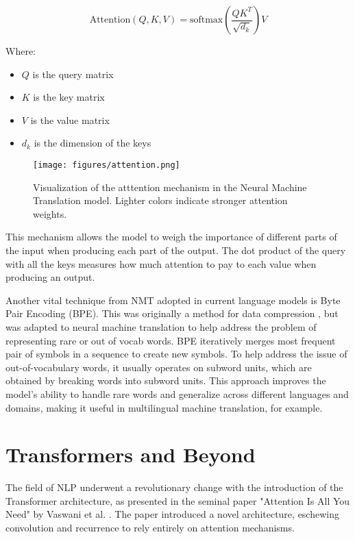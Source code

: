 \documentclass[a4paper, oneside]{discothesis}
\begin{document}
\begin{equation}
\text{Attention}(Q, K, V) = \text{softmax}\left(\frac{QK^T}{\sqrt{d_k}}\right)V
\end{equation}

Where:
\begin{itemize}
    \item $Q$ is the query matrix
    \item $K$ is the key matrix
    \item $V$ is the value matrix
    \item $d_k$ is the dimension of the keys
\end{itemize}

\begin{figure}[h]
    \centering
    \texttt{[image: figures/attention.png]}
    \caption{Visualization of the atttention mechanism in the Neural Machine Translation model. Lighter colors indicate stronger attention weights.}
    \label{fig:nmt_self_attention}
\end{figure}

This mechanism allows the model to weigh the importance of different parts of the input when producing each part of the output. The dot product of the query with all the keys measures how much attention to pay to each value when producing an output.

Another vital technique from NMT adopted in current language models is Byte Pair Encoding (BPE). This was originally a method for data compression \cite{gage}, but was adapted to neural machine translation to help address the problem of representing rare or out of vocab words\cite{sennrich2015neural}. BPE iteratively merges most frequent pair of symbols in a sequence to create new symbols. To help address the issue of out-of-vocabulary words, it usually operates on subword units, which are obtained by breaking words into subword units. This approach improves the model's ability to handle rare words and generalize across different languages and domains, making it useful in multilingual machine translation, for example.

\section{Transformers and Beyond}
The field of NLP underwent a revolutionary change with the introduction of the Transformer architecture, as presented in the seminal paper "Attention Is All You Need" by Vaswani et al. \cite{vaswani2023attentionneed}. The paper introduced a novel architecture, eschewing convolution and recurrence to rely entirely on attention mechanisms.
\end{document}
